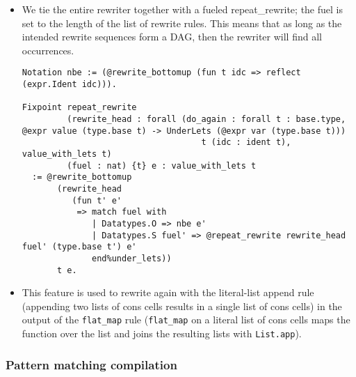 \begin{itemize}
\item
  We tie the entire rewriter together with a fueled repeat\_rewrite; the
  fuel is set to the length of the list of rewrite rules. This means
  that as long as the intended rewrite sequences form a DAG, then the
  rewriter will find all occurrences.

\begin{verbatim}
Notation nbe := (@rewrite_bottomup (fun t idc => reflect (expr.Ident idc))).

Fixpoint repeat_rewrite
         (rewrite_head : forall (do_again : forall t : base.type, @expr value (type.base t) -> UnderLets (@expr var (type.base t)))
                                    t (idc : ident t), value_with_lets t)
         (fuel : nat) {t} e : value_with_lets t
  := @rewrite_bottomup
       (rewrite_head
          (fun t' e'
           => match fuel with
              | Datatypes.O => nbe e'
              | Datatypes.S fuel' => @repeat_rewrite rewrite_head fuel' (type.base t') e'
              end%under_lets))
       t e.
\end{verbatim}
\item
  This feature is used to rewrite again with the literal-list append
  rule (appending two lists of cons cells results in a single list of
  cons cells) in the output of the \texttt{flat\_map} rule
  (\texttt{flat\_map} on a literal list of cons cells maps the function
  over the list and joins the resulting lists with \texttt{List.app}).
\end{itemize}

\hypertarget{pattern-matching-compilation}{%
\subsubsection{Pattern matching
compilation}\label{pattern-matching-compilation}}

